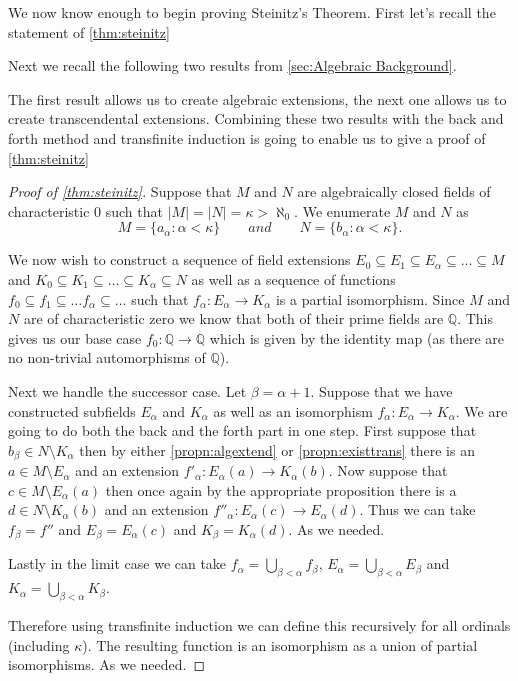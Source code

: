We now know enough to begin proving Steinitz's Theorem. First let's
recall the statement of \cref{thm:steinitz}

\steinitz*

Next we recall the following two results from \cref{sec:Algebraic Background}.

\algextend*

\transextend*

The first result allows us to create algebraic extensions, the next one allows
us to create transcendental extensions. Combining these two results with the
back and forth method and transfinite induction is going to enable us to give
a proof of \cref{thm:steinitz}

\begin{proof}[Proof of \cref{thm:steinitz}]
  Suppose that $M$ and $N$ are algebraically closed fields of characteristic
  0 such that $|M| = |N| = \kappa > \aleph_{0}$. We enumerate $M$ and $N$ as
  \[
  M = \{a_{\alpha}: \alpha < \kappa\} \qquad and \qquad N = \{b_{\alpha}:
  \alpha < \kappa\} 
  .\] 

  We now wish to construct a sequence of field extensions $E_0 \subseteq E_1
  \subseteq E_{\alpha} \subseteq \ldots \subseteq M$ and $K_0 \subseteq K_1
  \subseteq \ldots \subseteq K_{\alpha} \subseteq N$ as well as a sequence of
  functions $f_0 \subseteq f_1 \subseteq \ldots f_{\alpha} \subseteq \ldots$
  such that $f_{\alpha}: E_{\alpha} \to K_{\alpha}$ is a partial isomorphism.
  Since $M$ and $N$ are of characteristic zero we know that both of their prime
  fields are $\mathbb{Q}$. This gives us our base case $f_0: \mathbb{Q} \to
  \mathbb{Q}$ which is given by the identity map (as there are no non-trivial
  automorphisms of $\mathbb{Q}$).

  Next we handle the successor case. Let $\beta = \alpha + 1$.
  Suppose that we have constructed subfields
  $E_{\alpha}$ and $K_{\alpha}$ as well as an isomorphism $f_{\alpha}:
  E_{\alpha} \to K_{\alpha}$. We are going to do both the back and the forth
  part in one step. First suppose that $b_{\beta} \in N \setminus K_{\alpha}$ then by
  either \cref{propn:algextend} or \cref{propn:existtrans} there is an $a \in
  M \setminus E_{\alpha}$ and an extension $f'_{\alpha}: E_{\alpha}(a) \to
  K_{\alpha}(b)$. Now suppose that $c \in M \setminus E_{\alpha}(a)$ then once
  again by the appropriate proposition there is a $d \in N \setminus
  K_{\alpha}(b)$ and an extension $f''_{\alpha}: E_{\alpha}(c) \to
  E_{\alpha}(d)$. Thus we can take $f_{\beta} = f''$ and $E_{\beta}
  = E_{\alpha}(c)$ and $K_{\beta} = K_{\alpha}(d)$. As we needed.

  Lastly in the limit case we can take $f_{\alpha} = \bigcup_{\beta < \alpha}
  f_{\beta}$, $E_{\alpha} = \bigcup_{\beta < \alpha} E_{\beta}$ and $K_{\alpha}
  = \bigcup_{\beta < \alpha} K_{\beta}$.

  Therefore using transfinite induction we can define this recursively for all
  ordinals (including $\kappa$). The resulting function is an isomorphism as
  a union of partial isomorphisms. As we needed.
\end{proof}

